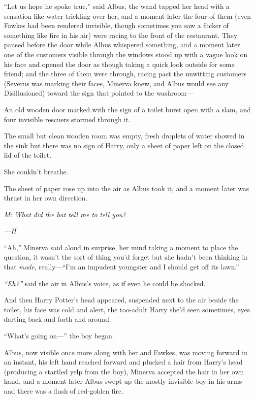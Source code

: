 ``Let us hope he spoke true,'' said Albus, the wand tapped her head with
a sensation like water trickling over her, and a moment later the four
of them (even Fawkes had been rendered invisible, though sometimes you
saw a flicker of something like fire in his air) were racing to the
front of the restaurant. They paused before the door while Albus
whispered something, and a moment later one of the customers visible
through the windows stood up with a vague look on his face and opened
the door as though taking a quick look outside for some friend; and the
three of them were through, racing past the unwitting customers (Severus
was marking their faces, Minerva knew, and Albus would see any
Disillusioned) toward the sign that pointed to the washroom---

An old wooden door marked with the sign of a toilet burst open with a
slam, and four invisible rescuers stormed through it.

The small but clean wooden room was empty, fresh droplets of water
showed in the sink but there was no sign of Harry, only a sheet of paper
left on the closed lid of the toilet.

She couldn't breathe.

The sheet of paper rose up into the air as Albus took it, and a moment
later was thrust in her own direction.

\emph{M: What did the hat tell me to tell you?}

\emph{---H}

``Ah,'' Minerva said aloud in surprise, her mind taking a moment to
place the question, it wasn't the sort of thing you'd forget but she
hadn't been thinking in that \emph{mode,} really---``I'm an impudent
youngster and I should get off its lawn.''

\emph{``Eh?''} said the air in Albus's voice, as if even he could be
shocked.

And then Harry Potter's head appeared, suspended next to the air beside
the toilet, his face was cold and alert, the too-adult Harry she'd seen
sometimes, eyes darting back and forth and around.

``What's going on---'' the boy began.

Albus, now visible once more along with her and Fawkes, was moving
forward in an instant, his left hand reached forward and plucked a hair
from Harry's head (producing a startled yelp from the boy), Minerva
accepted the hair in her own hand, and a moment later Albus swept up the
mostly-invisible boy in his arms and there was a flash of red-golden
fire.

